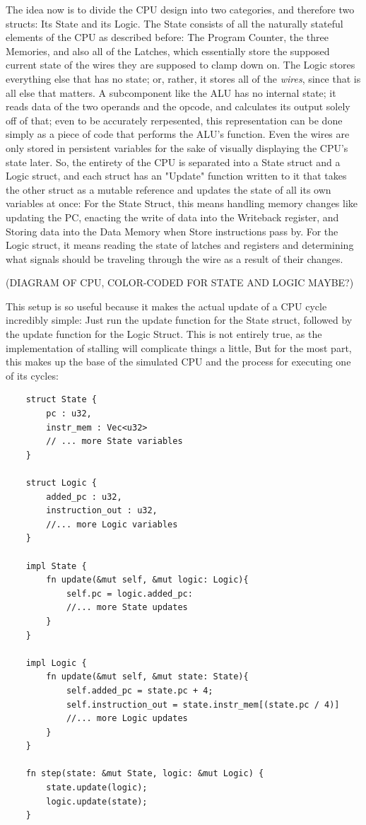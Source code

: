 \documentclass[12pt,twoside]{reedthesis}
\begin{document}
The idea now is to divide the CPU design into two categories, and therefore two structs: Its State and its Logic. The State consists of all the naturally  stateful elements of the CPU as described before: The Program Counter, the three Memories, and also all of the Latches, which essentially store the supposed current state of the wires they are supposed to clamp down on. The Logic stores everything else that has no state; or, rather, it stores all of the \textit{wires}, since that is all else that matters. A subcomponent like the ALU has no internal state; it reads data of the two operands and the opcode, and calculates its output solely off of that; even to be accurately rerpesented, this representation can be done simply as a piece of code that performs the ALU's function. Even the wires are only stored in persistent variables for the sake of visually displaying the CPU's state later. So, the entirety of the CPU is separated into a State struct and a Logic struct, and each struct has an "Update" function written to it that takes the other struct as a mutable reference and  updates the state of all its own variables at once: For the State Struct, this means handling memory changes like updating the PC, enacting the write of data into the Writeback register, and Storing data into the Data Memory when Store instructions pass by. For the Logic struct, it means reading the state of latches and registers and determining what signals should be traveling through the wire as a result of their changes.

(DIAGRAM OF CPU, COLOR-CODED FOR STATE AND LOGIC MAYBE?)

This setup is so useful because it makes the actual update of a CPU cycle incredibly simple: Just run the update function for the State struct, followed by the update function for the Logic Struct. This is not entirely true, as the implementation of stalling will complicate things a little, But for the most part, this makes up the base of the simulated CPU and the process for executing one of its cycles:

\begin{lstlisting}
	struct State {
		pc : u32,
		instr_mem : Vec<u32>
		// ... more State variables
	}

	struct Logic {
		added_pc : u32,
		instruction_out : u32,
		//... more Logic variables
	}

	impl State {
		fn update(&mut self, &mut logic: Logic){
			self.pc = logic.added_pc:
			//... more State updates
		}
	}

	impl Logic {
		fn update(&mut self, &mut state: State){
			self.added_pc = state.pc + 4;
			self.instruction_out = state.instr_mem[(state.pc / 4)]
			//... more Logic updates
		}
	}

	fn step(state: &mut State, logic: &mut Logic) {
		state.update(logic);
		logic.update(state);
	}
\end{lstlisting}
\end{document}

